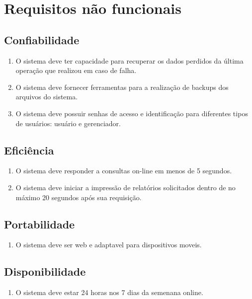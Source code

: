\documentclass[
	12pt,				%
    oneside,			%
	a4paper,			%
	chapter=TITLE,		%
	english,			%
	french,				%
	spanish,			%
	brazil,				%
	]{abntex2}
\begin{document}
	\section{Requisitos não funcionais}
	
		\subsection{Confiabilidade}
			\begin{enumerate}
				\item O sistema deve ter capacidade para recuperar os dados perdidos da última operação que realizou em caso de falha.
				\item O sistema deve fornecer ferramentas para a realização de backups dos arquivos do sistema.
				\item O sistema deve possuir senhas de acesso e identificação para diferentes tipos de usuários: usuário e gerenciador.
			\end{enumerate}

	
		\subsection{Eficiência}
			\begin{enumerate}
				\item O sistema deve responder a consultas on-line em menos de 5 segundos.
				\item O sistema deve iniciar a impressão de relatórios solicitados dentro de no máximo 20 segundos após sua requisição.
			\end{enumerate}
		\subsection{Portabilidade}
			\begin{enumerate}
				\item O sistema deve ser web e adaptavel para dispositivos moveis.
			\end{enumerate}
		\subsection{Disponibilidade}
			\begin{enumerate}
				\item O sistema deve estar 24 horas nos 7 dias da semenana online.
			\end{enumerate}
\end{document}
